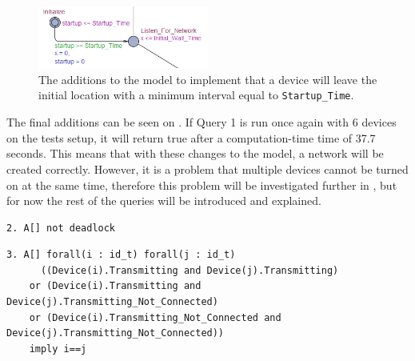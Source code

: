 
\begin{figure}
    \hspace{-10pt}
    \vspace{-10pt}
  \includegraphics[width=0.5\textwidth]{Figures/Model/IntervalStartup.PNG} 
\caption{The additions to the model to implement that a device will leave the initial location with a minimum interval equal to \texttt{Startup\_Time}.}
\label{fig:OneStartUp}
\end{figure}

The final additions can be seen on .
If Query 1 is run once again with 6 devices on the tests setup, it will return true after a computation-time time of 37.7 seconds.
This means that with these changes to the model, a network will be created correctly.
However, it is a problem that multiple devices cannot be turned on at the same time, therefore this problem will be investigated further in , but for now the rest of the queries will be introduced and explained.

\begin{lstlisting}[style=UPPAAL, title={The query requires that there is no deadlock in the system, it will result in true with a computation-time of 84.8 seconds when run on the test setup with 6 devices.}]
2. A[] not deadlock
\end{lstlisting}

\begin{lstlisting}[style=UPPAAL, title={This query requires that no pair of devices are in the \enquote*{Transmitting} state at the same time. The query will, when run with 6 devices on the test setup, result in true with a computation-time of 67.7 seconds.}]
3. A[] forall(i : id_t) forall(j : id_t) 
      ((Device(i).Transmitting and Device(j).Transmitting) 
    or (Device(i).Transmitting and Device(j).Transmitting_Not_Connected) 
    or (Device(i).Transmitting_Not_Connected and Device(j).Transmitting_Not_Connected)) 
    imply i==j
\end{lstlisting}

